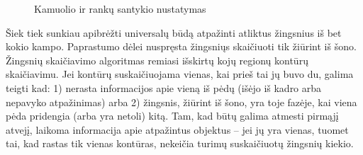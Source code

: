\documentclass{VUMIFPSbakalaurinis}
\begin{document}
\begin{figure}[H]
	\centering
	\qquad
	\qquad
	\qquad
	\caption{Kamuolio ir rankų santykio nustatymas}
	\label{fig:hand_and_ball}
\end{figure}

Šiek tiek sunkiau apibrėžti universalų būdą atpažinti atliktus žingsnius iš bet kokio kampo. Paprastumo dėlei nuspręsta žingsniųs skaičiuoti tik žiūrint iš šono. Žingsnių skaičiavimo algoritmas remiasi išskirtų kojų regionų kontūrų skaičiavimu. Jei kontūrų suskaičiuojama vienas, kai prieš tai jų buvo du, galima teigti kad: 1) nerasta informacijos apie vieną iš pėdų (išėjo iš kadro arba nepavyko atpažinimas) arba 2) žingsnis, žiūrint iš šono, yra toje fazėje, kai viena pėda pridengia (arba yra netoli) kitą. Tam, kad būtų galima atmesti pirmąjį atvejį, laikoma informacija apie atpažintus objektus – jei jų yra vienas, tuomet tai, kad rastas tik vienas kontūras, nekeičia turimų suskaičiuotų žingsnių kiekio. 
\end{document}
